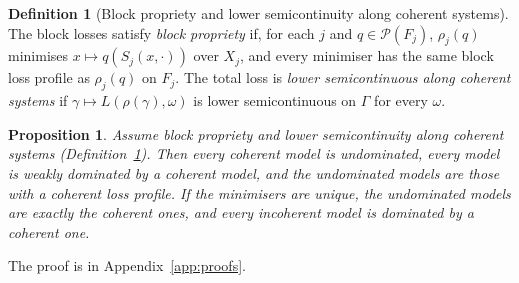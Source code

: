 \documentclass[11pt]{article}
\newtheorem{proposition}[theorem]{Proposition}
\theoremstyle{definition}
\newtheorem{definition}[theorem]{Definition}
\theoremstyle{remark}
\newcommand{\PP}{\mathcal P}
\begin{document}
\begin{definition}[Block propriety and lower semicontinuity along coherent systems]\label{def:block-propriety}
The block losses satisfy \emph{block propriety} if, for each $j$ and
$q\in\PP(F_j)$, $\rho_j(q)$ minimises $x\mapsto q(S_j(x,\cdot))$ over $X_j$,
and every minimiser has the same block loss profile as $\rho_j(q)$ on $F_j$.
The total loss is \emph{lower semicontinuous along coherent systems} if
$\gamma\mapsto L(\rho(\gamma),\omega)$ is lower semicontinuous on $\Gamma$ for every $\omega$.
\end{definition}

\begin{proposition}\label{prop:blocks}
Assume block propriety and lower semicontinuity along coherent systems (Definition~\ref{def:block-propriety}). Then every coherent model is undominated, every model is weakly dominated by a coherent model, and the undominated models are those with a coherent loss profile. If the minimisers are unique, the undominated models are exactly the coherent ones, and every incoherent model is dominated by a coherent one.
\end{proposition}
The proof is in Appendix~\ref{app:proofs}.
\end{document}
